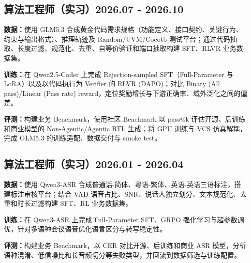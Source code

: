 \documentclass[a4paper,12pt]{article}
\begin{document}
\vspace*{10pt}
\subsection{{算法工程师（实习）}\hfill 2026.07 - 2026.10}
\begin{zitemize}
\item \textbf{数据：}使用 GLM5.3 合成黄金代码需求规格（功能定义、接口契约、关键行为、约束与输出格式）、推理轨迹及 Random/UVM/Cocotb 测试平台；通过代码抽取、长度过滤、规范化、去重、自等价验证和端口抽取构建 SFT、RLVR 业务数据集。
\item \textbf{训练：}在 Qwen2.5-Coder 上完成 Rejection-sampled SFT（Full-Parameter 与 LoRA）以及以代码执行为 Verifier 的 RLVR (DAPO)；对比 Binary (All pass)/Linear (Pass rate) reward，定位奖励增长与下游正确率、域外泛化之间的偏差。
\item \textbf{评测：}构建业务 Benchmark，使用社区 Benchmark 以 pass@k 评估开源、后训练和商业模型的 Non-Agentic/Agentic RTL 生成；将 GPU 训练与 VCS 仿真解耦，完成 GLM5.3 的训练适配、数据交付与 smoke test。
\end{zitemize}

\vspace*{6pt}
\subsection{{算法工程师（实习）}\hfill 2026.01 - 2026.04}
\begin{zitemize}
\item \textbf{数据：}使用 Qwen3-ASR 合成普通话-简体、粤语-繁体、英语-英语三语标注，搭建标注审核平台；结合 VAD 语音占比、SNR、说话人独立划分、文本规范化、去重和时长过滤构建 SFT、RL 业务数据集。
\item \textbf{训练：}在 Qwen3-ASR 上完成 Full-Parameter SFT、GRPO 强化学习与超参数调优，针对多语种会议语音优化语言区分与转写稳定性。
\item \textbf{评测：}构建业务 Benchmark，以 CER 对比开源、后训练和商业 ASR 模型，分析语种混淆、低信噪比和长音频切分等失败类型，并回流到数据筛选与训练配置。
\end{zitemize}
\end{document}
